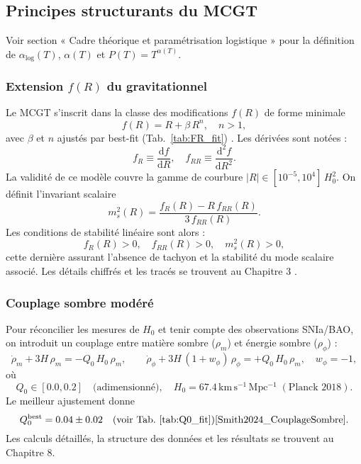 \subsection{Principes structurants du MCGT}

\noindent Voir section « Cadre théorique et paramétrisation logistique » pour la définition de \(\alpha_{\mathrm{log}}(T)\), \(\alpha(T)\) et \(P(T)=T^{\alpha(T)}\).

\subsubsection{Extension \(f(R)\) du gravitationnel}

Le MCGT s’inscrit dans la classe des modifications \(f(R)\) de forme minimale
\[
  f(R) = R + \beta\,R^{n},
  \quad n>1,
\]
avec \(\beta\) et \(n\) ajustés par best-fit (Tab.~\ref{tab:FR_fit}) \cite{MCGT_FR_analysis}.
Les dérivées sont notées :
\[
  f_{R}\equiv\frac{\mathrm d f}{\mathrm d R},
  \quad
  f_{RR}\equiv\frac{\mathrm d^{2} f}{\mathrm d R^{2}}.
\]
La validité de ce modèle couvre la gamme de courbure
\(\lvert R\rvert\in[10^{-5},10^{4}]\,H_{0}^{2}\).
On définit l’invariant scalaire
\[
  m_{s}^{2}(R)
  = \frac{f_{R}(R) - R\,f_{RR}(R)}{3\,f_{RR}(R)}.
\]
Les conditions de stabilité linéaire sont alors :
\[
  f_{R}(R) > 0,\quad f_{RR}(R) > 0,\quad m_{s}^{2}(R) > 0,
\]
cette dernière assurant l’absence de tachyon et la stabilité du mode scalaire associé.
Les détails chiffrés et les tracés se trouvent au Chapitre 3 \cite{MCGT_FR_analysis}.

\subsubsection{Couplage sombre modéré}

Pour réconcilier les mesures de \(H_{0}\) et tenir compte des observations SNIa/BAO, on introduit un couplage entre matière sombre (\(\rho_{m}\)) et énergie sombre (\(\rho_{\phi}\)) :
\[
  \dot{\rho}_{m} + 3H\,\rho_{m} = -Q_{0}\,H_{0}\,\rho_{m},
\qquad
  \dot{\rho}_{\phi} + 3H\,(1+w_{\phi})\,\rho_{\phi} = +Q_{0}\,H_{0}\,\rho_{m},
\quad w_{\phi}=-1,
\]
où
\[
  Q_{0}\in[0.0,0.2]\quad\text{(adimensionné)},
  \quad
  H_{0}=67.4\,\mathrm{km\,s^{-1}\,Mpc^{-1}}\;(\text{Planck 2018}).
\]
Le meilleur ajustement donne
\[
  Q_{0}^{\mathrm{best}} = 0.04 \pm 0.02
  \quad(\text{voir Tab.~\ref{tab:Q0_fit}})\cite{Smith2024_CouplageSombre}.
\]
Les calculs détaillés, la structure des données et les résultats se trouvent au Chapitre 8.

